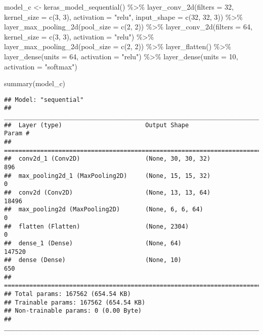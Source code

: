 \documentclass[
]{article}
\newenvironment{Shaded}{\begin{snugshade}}{\end{snugshade}}
\newcommand{\AttributeTok}[1]{\textcolor[rgb]{0.77,0.63,0.00}{#1}}
\newcommand{\DecValTok}[1]{\textcolor[rgb]{0.00,0.00,0.81}{#1}}
\newcommand{\FunctionTok}[1]{\textcolor[rgb]{0.00,0.00,0.00}{#1}}
\newcommand{\NormalTok}[1]{#1}
\newcommand{\OtherTok}[1]{\textcolor[rgb]{0.56,0.35,0.01}{#1}}
\newcommand{\SpecialCharTok}[1]{\textcolor[rgb]{0.00,0.00,0.00}{#1}}
\newcommand{\StringTok}[1]{\textcolor[rgb]{0.31,0.60,0.02}{#1}}
\begin{document}
\begin{Shaded}
\begin{Highlighting}[]
\NormalTok{model\_c }\OtherTok{\textless{}{-}} \FunctionTok{keras\_model\_sequential}\NormalTok{() }\SpecialCharTok{\%\textgreater{}\%}
  \FunctionTok{layer\_conv\_2d}\NormalTok{(}\AttributeTok{filters =} \DecValTok{32}\NormalTok{, }\AttributeTok{kernel\_size =} \FunctionTok{c}\NormalTok{(}\DecValTok{3}\NormalTok{, }\DecValTok{3}\NormalTok{), }\AttributeTok{activation =} \StringTok{"relu"}\NormalTok{, }\AttributeTok{input\_shape =} \FunctionTok{c}\NormalTok{(}\DecValTok{32}\NormalTok{, }\DecValTok{32}\NormalTok{, }\DecValTok{3}\NormalTok{)) }\SpecialCharTok{\%\textgreater{}\%}
  \FunctionTok{layer\_max\_pooling\_2d}\NormalTok{(}\AttributeTok{pool\_size =} \FunctionTok{c}\NormalTok{(}\DecValTok{2}\NormalTok{, }\DecValTok{2}\NormalTok{)) }\SpecialCharTok{\%\textgreater{}\%}
  \FunctionTok{layer\_conv\_2d}\NormalTok{(}\AttributeTok{filters =} \DecValTok{64}\NormalTok{, }\AttributeTok{kernel\_size =} \FunctionTok{c}\NormalTok{(}\DecValTok{3}\NormalTok{, }\DecValTok{3}\NormalTok{), }\AttributeTok{activation =} \StringTok{"relu"}\NormalTok{) }\SpecialCharTok{\%\textgreater{}\%}
  \FunctionTok{layer\_max\_pooling\_2d}\NormalTok{(}\AttributeTok{pool\_size =} \FunctionTok{c}\NormalTok{(}\DecValTok{2}\NormalTok{, }\DecValTok{2}\NormalTok{)) }\SpecialCharTok{\%\textgreater{}\%}
  \FunctionTok{layer\_flatten}\NormalTok{() }\SpecialCharTok{\%\textgreater{}\%}
  \FunctionTok{layer\_dense}\NormalTok{(}\AttributeTok{units =} \DecValTok{64}\NormalTok{, }\AttributeTok{activation =} \StringTok{"relu"}\NormalTok{) }\SpecialCharTok{\%\textgreater{}\%}
  \FunctionTok{layer\_dense}\NormalTok{(}\AttributeTok{units =} \DecValTok{10}\NormalTok{, }\AttributeTok{activation =} \StringTok{"softmax"}\NormalTok{)}
  
\FunctionTok{summary}\NormalTok{(model\_c)}
\end{Highlighting}
\end{Shaded}

\begin{verbatim}
## Model: "sequential"
## ________________________________________________________________________________
##  Layer (type)                       Output Shape                    Param #     
## ================================================================================
##  conv2d_1 (Conv2D)                  (None, 30, 30, 32)              896         
##  max_pooling2d_1 (MaxPooling2D)     (None, 15, 15, 32)              0           
##  conv2d (Conv2D)                    (None, 13, 13, 64)              18496       
##  max_pooling2d (MaxPooling2D)       (None, 6, 6, 64)                0           
##  flatten (Flatten)                  (None, 2304)                    0           
##  dense_1 (Dense)                    (None, 64)                      147520      
##  dense (Dense)                      (None, 10)                      650         
## ================================================================================
## Total params: 167562 (654.54 KB)
## Trainable params: 167562 (654.54 KB)
## Non-trainable params: 0 (0.00 Byte)
## ________________________________________________________________________________
\end{verbatim}
\end{document}

